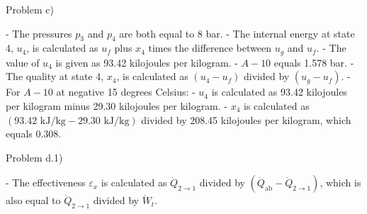Problem c)

- The pressures \( p_3 \) and \( p_4 \) are both equal to 8 bar.
- The internal energy at state 4, \( u_4 \), is calculated as \( u_f \) plus \( x_4 \) times the difference between \( u_g \) and \( u_f \).
- The value of \( u_4 \) is given as 93.42 kilojoules per kilogram.
- \( A-10 \) equals 1.578 bar.
- The quality at state 4, \( x_4 \), is calculated as \( (u_4 - u_f) \) divided by \( (u_g - u_f) \).
- For \( A-10 \) at negative 15 degrees Celsius:
  - \( u_4 \) is calculated as 93.42 kilojoules per kilogram minus 29.30 kilojoules per kilogram.
  - \( x_4 \) is calculated as \( (93.42 \text{ kJ/kg} - 29.30 \text{ kJ/kg}) \) divided by 208.45 kilojoules per kilogram, which equals 0.308.

Problem d.1)

- The effectiveness \( \varepsilon_x \) is calculated as \( \dot{Q}_{2\to1} \) divided by \( (\dot{Q}_{\text{ab}} - \dot{Q}_{2\to1}) \), which is also equal to \( \dot{Q}_{2\to1} \) divided by \( \dot{W}_{t} \).